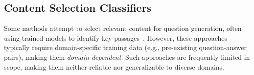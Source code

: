 \subsection{Content Selection Classifiers}

Some methods attempt to select relevant content for question generation, often using trained models to identify key passages~\citep{context_Steuer, Context_diverse_hadifar}. However, these approaches typically require domain-specific training data (e.g., pre-existing question-answer pairs), making them {\em domain-dependent}. Such approaches are frequently limited in scope, making them neither reliable nor generalizable to diverse domains. 
